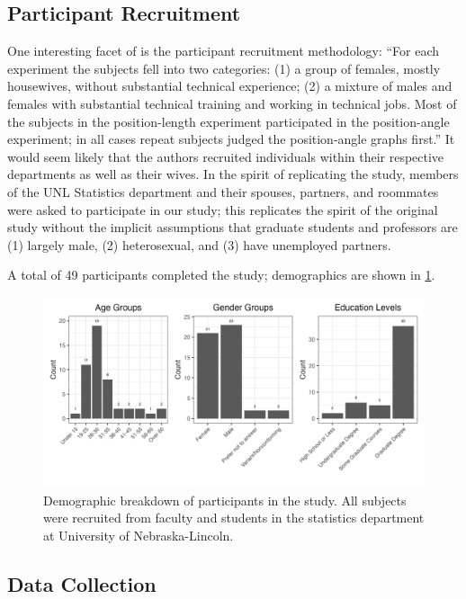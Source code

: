 \documentclass[letterpaper,inpress,dvipsnames]{jdsart}
\begin{document}
\hypertarget{participant-recruitment}{%
\subsection{Participant Recruitment}\label{participant-recruitment}}

One interesting facet of \citet{cleveland_graphical_1984} is the participant recruitment methodology: ``For each experiment the subjects fell into two categories: (1) a group of females, mostly housewives, without substantial technical experience; (2) a mixture of males and females with substantial technical training and working in technical jobs.
Most of the subjects in the position-length experiment participated in the position-angle experiment; in all cases repeat subjects judged the position-angle graphs first.''
It would seem likely that the authors recruited individuals within their respective departments as well as their wives.
In the spirit of replicating the study, members of the UNL Statistics department and their spouses, partners, and roommates were asked to participate in our study; this replicates the spirit of the original study without the implicit assumptions that graduate students and professors are (1) largely male, (2) heterosexual, and (3) have unemployed partners.

A total of 49 participants completed the study; demographics are shown in \ref{fig:demographics}.

\begin{figure}
\includegraphics[width=0.85\linewidth]{demographic-plots} \caption{Demographic breakdown of participants in the study. All subjects were recruited from faculty and students in the statistics department at University of Nebraska-Lincoln.}\label{fig:demographics}
\end{figure}

\hypertarget{data-collection}{%
\subsection{Data Collection}\label{data-collection}}
\end{document}
